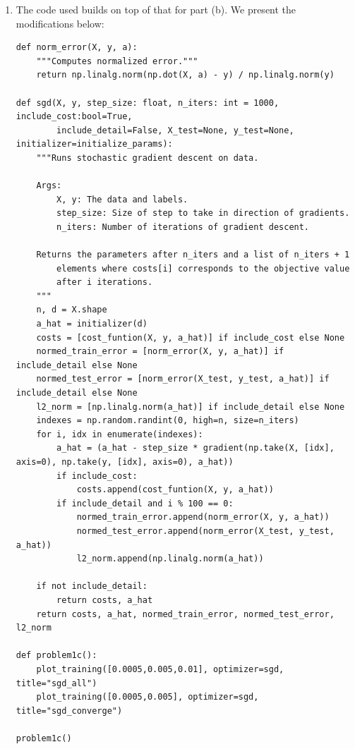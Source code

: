 \documentclass[12pt]{article}
\begin{document}
\begin{enumerate}[label=(\alph*)]
  \item
    The code used builds on top of that for part (b). We present the modifications below:
    \begin{verbatim}
def norm_error(X, y, a):
    """Computes normalized error."""
    return np.linalg.norm(np.dot(X, a) - y) / np.linalg.norm(y)

def sgd(X, y, step_size: float, n_iters: int = 1000, include_cost:bool=True,
        include_detail=False, X_test=None, y_test=None, initializer=initialize_params):
    """Runs stochastic gradient descent on data.
    
    Args:
        X, y: The data and labels.
        step_size: Size of step to take in direction of gradients.
        n_iters: Number of iterations of gradient descent.
        
    Returns the parameters after n_iters and a list of n_iters + 1
        elements where costs[i] corresponds to the objective value
        after i iterations.
    """
    n, d = X.shape
    a_hat = initializer(d)
    costs = [cost_funtion(X, y, a_hat)] if include_cost else None
    normed_train_error = [norm_error(X, y, a_hat)] if include_detail else None
    normed_test_error = [norm_error(X_test, y_test, a_hat)] if include_detail else None
    l2_norm = [np.linalg.norm(a_hat)] if include_detail else None
    indexes = np.random.randint(0, high=n, size=n_iters)
    for i, idx in enumerate(indexes):
        a_hat = (a_hat - step_size * gradient(np.take(X, [idx], axis=0), np.take(y, [idx], axis=0), a_hat))
        if include_cost:
            costs.append(cost_funtion(X, y, a_hat))
        if include_detail and i % 100 == 0:
            normed_train_error.append(norm_error(X, y, a_hat))
            normed_test_error.append(norm_error(X_test, y_test, a_hat))
            l2_norm.append(np.linalg.norm(a_hat))
            
    if not include_detail:
        return costs, a_hat
    return costs, a_hat, normed_train_error, normed_test_error, l2_norm

def problem1c():
    plot_training([0.0005,0.005,0.01], optimizer=sgd, title="sgd_all")
    plot_training([0.0005,0.005], optimizer=sgd, title="sgd_converge")

problem1c()
    \end{verbatim}
    

\end{enumerate}
\end{document}
